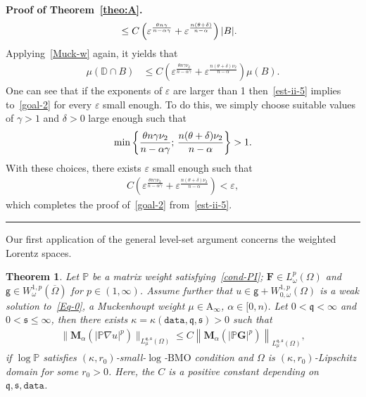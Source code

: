 \documentclass[a4paper, 11pt]{article}
\newtheorem{theorem}{Theorem}[section]
\newenvironment{proof}[1][Proof]{\textbf{#1.} }{\hfill\rule{0.5em}{0.5em}}
\begin{document}
\begin{proof}[Proof of Theorem~\ref{theo:A}]
\begin{align}
& \le C \left(\varepsilon^{\frac{\theta n\gamma}{n-\alpha\gamma}} + \varepsilon^{\frac{n(\theta+\delta)}{n-\alpha}}\right) |B|.\notag
\end{align}
Applying~\eqref{Muck-w} again, it yields that
\begin{align}
\mu(\mathbb{D}\cap B) & \le C \left(\varepsilon^{\frac{\theta n\gamma\nu_2}{n-\alpha\gamma}} + \varepsilon^{\frac{n(\theta+\delta)\nu_2}{n-\alpha}}\right) \mu(B).\label{est-ii-5}
\end{align}
One can see that if the exponents of $\varepsilon$ are larger than 1 then~\eqref{est-ii-5} implies to~\eqref{goal-2} for every $\varepsilon$ small enough. To do this, we simply choose suitable values of $\gamma>1$ and $\delta>0$ large enough such that
\begin{align}\notag %
\min\left\{\frac{\theta n\gamma\nu_2}{n-\alpha\gamma}; \, \frac{n(\theta+\delta)\nu_2}{n-\alpha}\right\} > 1.
\end{align}
With these choices, there exists $\varepsilon$ small enough such that
\begin{align*}
C \left(\varepsilon^{\frac{\theta n\gamma\nu_2}{n-\alpha\gamma}} + \varepsilon^{\frac{n(\theta+\delta)\nu_2}{n-\alpha}}\right) < \varepsilon,
\end{align*}
which completes the proof of~\eqref{goal-2} from~\eqref{est-ii-5}. 
\end{proof}

Our first application of the general level-set argument concerns the weighted Lorentz spaces.

\begin{theorem}\label{theo:B}
Let $\mathbb{P}$ be a matrix weight satisfying~\eqref{cond-PI}; $\mathbf{F} \in L^{p}_{\omega}(\Omega)$ and $\mathsf{g} \in W^{1,p}_{\omega}(\overline{\Omega})$ for $p \in (1,\infty)$. Assume further that $u \in \mathsf{g} + W^{1,p}_{0,\omega}(\Omega)$ is a weak solution to~\eqref{Eq-0}, a Muckenhoupt weight $\mu \in \mathrm{A}_{\infty}$, $\alpha \in [0,n)$. Let $0<\mathfrak{q}<\infty$ and $0<\mathfrak{s}\le\infty$, then there exists $\kappa = \kappa(\mathtt{data},\mathfrak{q},\mathfrak{s})>0$ such that 
\begin{align}\label{est:B}
\|\mathbf{M}_{\alpha}(|\mathbb{P}\nabla u|^{p})\|_{L^{\mathfrak{q},\mathfrak{s}}_{\mu}(\Omega)}  \le C\left\|\mathbf{M}_{\alpha}(|\mathbb{P}\mathbf{G}|^{p})\right\|_{L^{\mathfrak{q},\mathfrak{s}}_{\mu}(\Omega)},
\end{align}
 if $\log \mathbb{P}$ satisfies $(\kappa,r_0)$-small-$\log$-$\mathrm{BMO}$ condition and $\Omega$ is $(\kappa,r_0)$-Lipschitz domain for some $r_0>0$. Here, the $C$ is a positive constant depending on $\mathfrak{q},\mathfrak{s},\mathtt{data}$.
\end{theorem}
\end{document}
